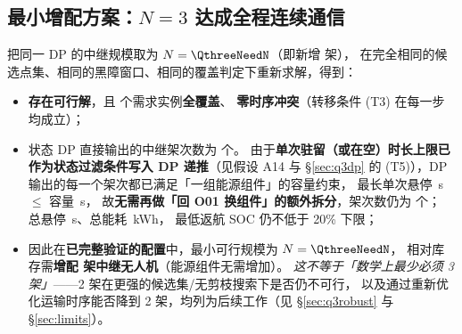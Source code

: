 \documentclass[12pt,a4paper,fontset=windows]{ctexart}
\begin{document}
\subsection{最小增配方案：$N=3$ 达成全程连续通信}\label{sec:q3minadd}
把同一 DP 的中继规模取为 $N=\QthreeNeedN$（即新增 \QthreeGapN{} 架），
在完全相同的候选点集、相同的黑障窗口、相同的覆盖判定下重新求解，得到：

\begin{itemize}[leftmargin=2.2em,itemsep=2pt]
\item \textbf{存在可行解}，且 \QthreeDpInstances{} 个需求实例\textbf{全覆盖}、
\textbf{零时序冲突}（转移条件 (T3) 在每一步均成立）；
\item 状态 DP 直接输出的中继架次数为 \QthreeNThreeSorties{} 个。
由于\textbf{单次驻留（或在空）时长上限已作为状态过滤条件写入 DP 递推}（见假设 A14 与
\S\ref{sec:q3dp} 的 (T5)），DP 输出的每一个架次都已满足「一组能源组件」的容量约束，
最长单次悬停 \QthreeNThreeMaxHoverS\,s $\le$ 容量 \QthreeEnergyCap\,s，
故\textbf{无需再做「回 O01 换组件」的额外拆分}，架次数仍为 \QthreeNThreeSortiesSplit{} 个；
总悬停 \QthreeNThreeHoverS\,s、总能耗 \QthreeNThreeEnergy\,kWh，
最低返航 SOC 仍不低于 20\% 下限；
\item 因此在\textbf{已完整验证的配置}中，最小可行规模为 $N=\QthreeNeedN$，
相对库存需\textbf{增配 \QthreeGapN{} 架中继无人机}（能源组件无需增加）。
\emph{这不等于「数学上最少必须 3 架」}——2 架在更强的候选集/无剪枝搜索下是否仍不可行，
以及通过重新优化运输时序能否降到 2 架，均列为后续工作（见 \S\ref{sec:q3robust} 与
\S\ref{sec:limits}）。
\end{itemize}
\end{document}
